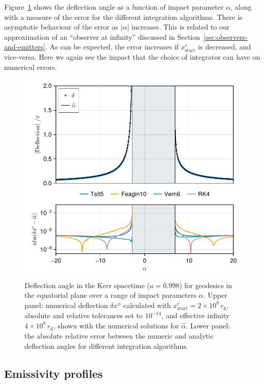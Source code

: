 \documentclass[fleqn,usenatbib]{mnras}
\newcommand{\rg}{r_\text{g}}
\begin{document}
Figure~\ref{fig:deflection-angle} shows the deflection angle as a function of
impact parameter $\alpha$, along with a  measure of the error for the different
integration algorithms. There is asymptotic behaviour of the error as $\lvert
\alpha \rvert$ increases. This is related to our approximation of an ``observer
at infinity'' discussed in Section~\ref{sec:observers-and-emitters}. As can be
expected, the error increases if $x^r_\text{start}$ is decreased, and
vice-versa. Here we again see the impact that the choice of integrator can have
on numerical errors.

\begin{figure}
    \centering
    \includegraphics[width=0.94\columnwidth]{figures/deflection.iyer-hansen.pdf}
    \caption{Deflection angle in the Kerr spacetime ($a = 0.998$) for geodesics
        in the equatorial plane over a range of impact parameters $\alpha$.
        Upper panel: numerical deflection $\delta x^\phi$ calculated with
        $x^r_\text{start} = 2 \times 10^8 \, \rg$, absolute and relative
        tolerances set to $10^{-14}$, and effective infinity $4 \times 10^8\,
        \rg$, shown with the numerical solutions for $\hat{\alpha}$. Lower
        panel: the absolute relative error between the numeric and analytic
        deflection angles for different integration algorithms.}
    \label{fig:deflection-angle}
\end{figure}

\subsection{Emissivity profiles}
\end{document}
